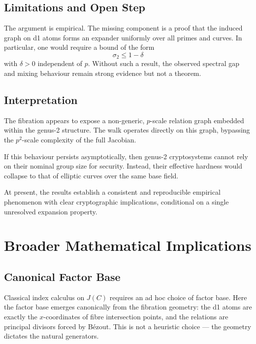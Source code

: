 \documentclass[11pt]{article}
\theoremstyle{definition}
\theoremstyle{remark}
\begin{document}
\subsection{Limitations and Open Step}

The argument is empirical. The missing component is a proof that the induced
graph on d1 atoms forms an expander uniformly over all primes and curves. In
particular, one would require a bound of the form
\[
  \sigma_2 \leq 1 - \delta
\]
with $\delta > 0$ independent of $p$. Without such a result, the observed
spectral gap and mixing behaviour remain strong evidence but not a theorem.

\subsection{Interpretation}

The fibration appears to expose a non-generic, $p$-scale relation graph embedded
within the genus-2 structure. The walk operates directly on this graph,
bypassing the $p^2$-scale complexity of the full Jacobian.

If this behaviour persists asymptotically, then genus-2 cryptosystems cannot
rely on their nominal group size for security. Instead, their effective hardness
would collapse to that of elliptic curves over the same base field.

At present, the results establish a consistent and reproducible empirical
phenomenon with clear cryptographic implications, conditional on a single
unresolved expansion property.

\section{Broader Mathematical Implications}
\label{sec:implications}

\subsection{Canonical Factor Base}

Classical index calculus on $J(C)$ requires an ad hoc choice of factor base.
Here the factor base emerges canonically from the fibration geometry: the d1
atoms are exactly the $x$-coordinates of fibre intersection points, and the
relations are principal divisors forced by Bézout. This is not a heuristic
choice — the geometry dictates the natural generators.
\end{document}

